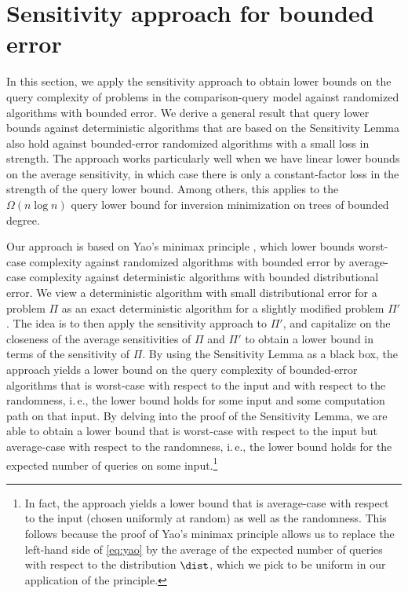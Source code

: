 \documentclass[11pt]{article}
\numberwithin{equation}{section}
\theoremstyle{definition}
\theoremstyle{plain}
\newcommand{\ie}{i.\,e.}
\begin{document}
\section{Sensitivity approach for bounded error}
\label{sec:random}

In this section, we apply the sensitivity approach to obtain lower bounds on the query complexity of problems in the comparison-query model against randomized algorithms with bounded error. We derive a general
%
result that query lower bounds against deterministic algorithms that are based on the Sensitivity
%
Lemma also  %
hold against bounded-error randomized algorithms with a small loss in strength. The approach works particularly well when we have linear lower bounds on the average sensitivity, in which case there is only a constant-factor loss in the strength of the query lower bound. Among others, this applies to the $\Omega(n \log n)$ query lower bound for inversion minimization on trees of bounded degree.

%
%

Our approach is based on Yao's minimax principle \cite{Yao77}, which lower bounds worst-case complexity against randomized algorithms with bounded error by average-case complexity against deterministic algorithms with bounded distributional error. We view a deterministic algorithm with small distributional error for a problem $\Pi$ as an exact deterministic algorithm for a slightly modified problem $\Pi'$. The idea is to then apply the sensitivity approach to $\Pi'$, and capitalize on the closeness of the average sensitivities of $\Pi$ and $\Pi'$ to obtain a lower bound in terms of the sensitivity of $\Pi$. By using the Sensitivity Lemma as a %
black box,  %
the approach yields a lower bound on the query complexity of bounded-error algorithms that is worst-case with respect to the input and with respect to the randomness, \ie, the lower bound holds for some input and some computation path on that input. By delving into the proof of the Sensitivity Lemma, we are able to obtain a lower bound that is worst-case with respect to the input but average-case with respect to the randomness, \ie, the lower bound holds for the expected number of queries on some input.\footnote{In fact, the approach yields a lower bound that is average-case with respect to the input (chosen uniformly at random) as well as the randomness. This follows because the proof of Yao's minimax principle allows us to replace the left-hand side of \eqref{eq:yao} by the average of the expected number of queries with respect to the distribution $\dist$, which we pick to be uniform in our application of the principle.}
\end{document}
